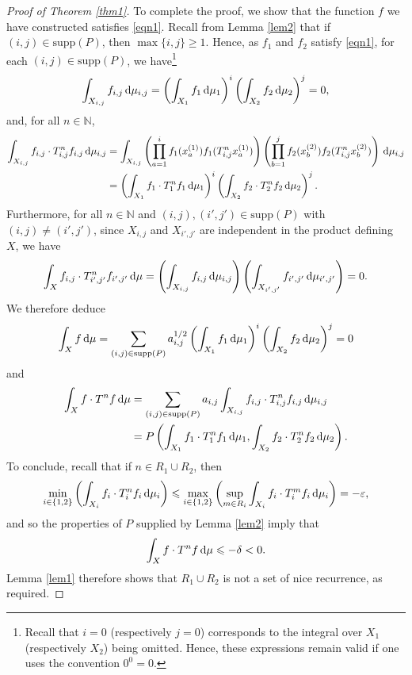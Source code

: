 \documentclass[reqno,a4paper,12pt]{amsart}
\theoremstyle{definition}
\theoremstyle{remark}
\def\d{{\,{\rm d}}}
\def \N {\mathbb{N}}
\def\eps{\varepsilon}
\def\supp{\mathrm{supp}}
\begin{document}
\begin{proof}[Proof of Theorem \ref{thm1}]
    To complete the proof, we show that the function $f$ we have constructed satisfies \eqref{eqn1}. Recall from Lemma \ref{lem2} that if $(i,j)\in\supp(P)$, then $\max\{i,j\}\geqslant 1$. Hence, as $f_1$ and $f_2$ satisfy \eqref{eqn1}, for each $(i,j)\in\supp(P)$, we have\footnote{Recall that $i=0$ (respectively $j=0$) corresponds to the integral over $X_1$ (respectively $X_2$) being omitted. Hence, these expressions remain valid if one uses the convention $0^0 = 0$.}
    \begin{equation*}
        \int_{X_{i,j}}f_{i,j}\d\mu_{i,j} = \left(\int_{X_1}f_1 \d\mu_1\right)^i\left(\int_{X_2}f_2 \d\mu_2\right)^j = 0,
    \end{equation*}
    and, for all $n\in\N$,
    \begin{align*}
        \int_{X_{i,j}}f_{i,j}\cdot T_{i,j}^n f_{i,j}\d\mu_{i,j} &= \int_{X_{i,j}}\left(\prod_{a=1}^i f_1(x_a^{(1)})f_1(T_{i,j}^n x_a^{(1)})\right)\left(\prod_{b=1}^j f_2(x_b^{(2)})f_2(T_{i,j}^n x_b^{(2)})\right)\d\mu_{i,j}\\
        &= \left(\int_{X_1}f_1\cdot T_1^nf_1 \d\mu_1 \right)^i \left(\int_{X_2}f_2 \cdot T_2^n f_2 \d\mu_2 \right)^j.
    \end{align*}
    Furthermore, for all $n\in\N$ and $(i,j),(i',j')\in\supp(P)$ with $(i,j)\neq (i',j')$, since $X_{i,j}$ and $X_{i',j'}$ are independent in the product defining $X$, we have
    \begin{equation*}
        \int_{X}f_{i,j}\cdot T_{i',j'}^n f_{i',j'}\d\mu = \left(\int_{X_{i,j}}f_{i,j} \d\mu_{i,j} \right)\left(\int_{X_{i',j'}}f_{i',j'} \d\mu_{i',j'} \right) = 0.
    \end{equation*} 
    We therefore deduce
        \begin{equation*}
        \int_X f\d\mu = \sum_{(i,j)\in\supp(P)}a_{i,j}^{1/2}\left(\int_{X_1}f_1 \d\mu_1\right)^i\left(\int_{X_2}f_2 \d\mu_2\right)^j = 0
    \end{equation*}
    and
    \begin{align*}
    \int_X f\cdot T^n f \d\mu &= \sum_{(i,j)\in\supp(P)}a_{i,j}\int_{X_{i,j}}f_{i,j}\cdot T_{i,j}^nf_{i,j} \d\mu_{i,j}\\
    &=  P\left(\int_{X_1}f_1\cdot T_1^n f_1\d\mu_1, \int_{X_2}f_2\cdot T_2^n f_2 \d\mu_2\right).
    \end{align*}
    To conclude, recall that if $n\in R_1\cup R_2$, then
    \begin{equation*}
        \min_{i\in\{1,2\}}\left(\int_{X_i}f_i\cdot T_i^n f_i \d\mu_i\right) \leqslant \max_{i\in\{1,2\}}\left(\sup_{m\in R_i}\int_{X_i} f_i\cdot T_i^m f_i \d\mu_i\right)= -\eps,
    \end{equation*}
    and so the properties of $P$ supplied by Lemma \ref{lem2} imply that
    \begin{equation*}
        \int_X f\cdot T^nf \d\mu \leqslant -\delta <0.
    \end{equation*}
    Lemma \ref{lem1} therefore shows that $R_1\cup R_2$ is not a set of nice recurrence, as required.
\end{proof}
\end{document}
